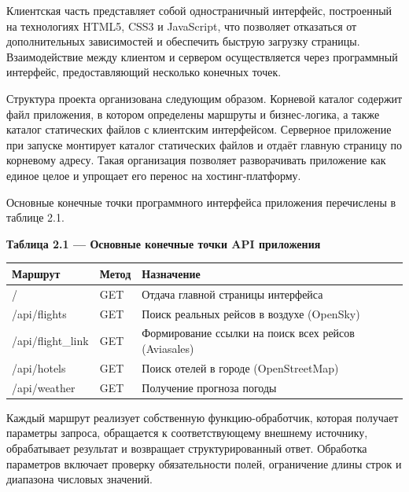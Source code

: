 \documentclass[14pt,a4paper,oneside]{extreport}
\begin{document}
Клиентская часть представляет собой одностраничный интерфейс, построенный на технологиях HTML5, CSS3 и JavaScript, что позволяет отказаться от дополнительных зависимостей и обеспечить быструю загрузку страницы. Взаимодействие между клиентом и сервером осуществляется через программный интерфейс, предоставляющий несколько конечных точек.

Структура проекта организована следующим образом. Корневой каталог содержит файл приложения, в котором определены маршруты и бизнес-логика, а также каталог статических файлов с клиентским интерфейсом. Серверное приложение при запуске монтирует каталог статических файлов и отдаёт главную страницу по корневому адресу. Такая организация позволяет разворачивать приложение как единое целое и упрощает его перенос на хостинг-платформу.

Основные конечные точки программного интерфейса приложения перечислены в таблице 2.1.

\begin{table}[htbp]\centering

\textbf{Таблица 2.1 — Основные конечные точки API приложения}\par\vspace{4pt}

\begin{center}
\small
\begin{tabularx}{\textwidth}{|X|X|X|}
\hline
Маршрут & Метод & Назначение \\
\hline
/ & GET & Отдача главной страницы интерфейса \\
\hline
/api/flights & GET & Поиск реальных рейсов в воздухе (OpenSky) \\
\hline
/api/flight\_link & GET & Формирование ссылки на поиск всех рейсов (Aviasales) \\
\hline
/api/hotels & GET & Поиск отелей в городе (OpenStreetMap) \\
\hline
/api/weather & GET & Получение прогноза погоды \\
\hline
\end{tabularx}
\end{center}

\end{table}

Каждый маршрут реализует собственную функцию-обработчик, которая получает параметры запроса, обращается к соответствующему внешнему источнику, обрабатывает результат и возвращает структурированный ответ. Обработка параметров включает проверку обязательности полей, ограничение длины строк и диапазона числовых значений.
\end{document}
